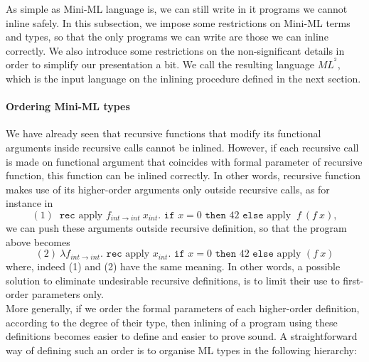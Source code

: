 \documentclass[a4paper,11pt,oneside]{article}
\theoremstyle{plain}
\newcommand{\inlsrc}{\textit{ML}^{^2}}
\begin{document}
	As simple as Mini-ML language is, we can still write in it programs we cannot inline safely. 
	In this subsection, we impose some restrictions on Mini-ML terms and types, so that the only programs we can write are those we can inline correctly.  
	We also introduce some restrictions on the non-significant details in order to simplify our presentation a bit.
	We call the resulting language $\inlsrc$, which is the input language on the inlining procedure defined in the next section.

\paragraph{Ordering Mini-ML types}

	We have already seen that recursive functions that modify its functional arguments inside recursive calls cannot be inlined. 
	However, if each recursive call is made on functional argument that coincides with formal parameter of recursive function, this function can be inlined correctly. 
	In other words, recursive function makes use of its higher-order arguments only outside recursive calls, as for instance in 	
	$$(1)~ \texttt{ rec } \text{apply } f_{int \rightarrow int}~x_{int} .
  \texttt{ if } x = 0 \texttt{ then } 42 \texttt{ else} \text{ apply }~ f~ (f~x) ,$$ we can push these arguments outside recursive definition, so that the program above becomes
  $$(2)~ \lambda f_{int \rightarrow int}. \texttt{ rec } \text{apply } x_{int} .
  \texttt{ if } x = 0 \texttt{ then } 42 \texttt{ else} \text{ apply } (f~x)$$
where, indeed (1) and (2) have the same meaning.	
  In other words, a possible solution to eliminate undesirable recursive definitions, is to limit their use to first-order parameters only. \\
 
 	More generally, if we order the formal parameters of each higher-order definition, according to the degree of their type, then inlining of a program using these definitions becomes easier to define and easier to prove sound.
  A straightforward way of defining such an order is to organise ML types in the following hierarchy:
\end{document}
